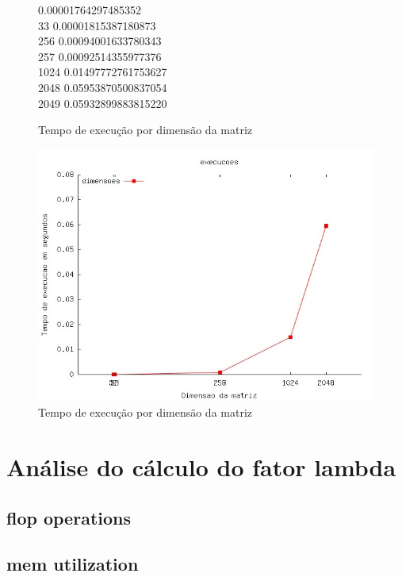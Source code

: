 \documentclass[12pt]{article}
\begin{document}
\begin{figure}[htb]
\begin{tt}      0.00001764297485352\\
    33      0.00001815387180873\\
    256     0.00094001633780343\\
    257     0.00092514355977376\\
    1024    0.01497772761753627\\
    2048    0.05953870500837054\\
    2049    0.05932899883815220\\
\end{tt}\caption{Tempo de execução por dimensão da matriz}\label{fig:tabelaExecucoes}
\end{figure}

\begin{figure}[htb] \begin{center}
\includegraphics[width=150mm]{execucoes.jpg} \end{center}
\caption{Tempo de execução por dimensão da matriz}\label{fig:execucao}
\end{figure}

\section{Análise do cálculo do fator lambda}\label{sec:lambda}
\subsection{flop operations}
\subsection{mem utilization}
\end{document}
